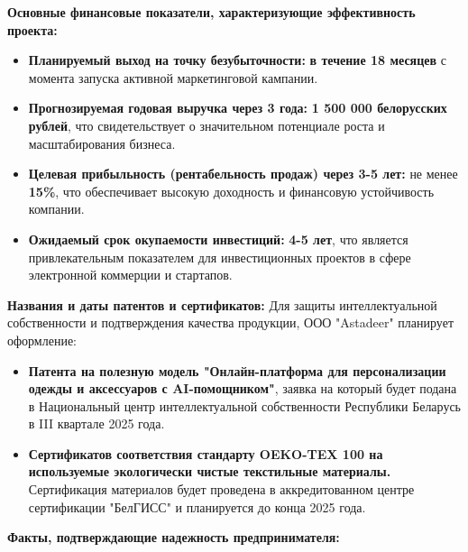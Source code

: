\vspace{0.5cm}

\textbf{Основные финансовые показатели, характеризующие эффективность проекта:}

\begin{itemize}
    \item \textbf{Планируемый выход на точку безубыточности:}  \textbf{в течение 18 месяцев} с момента запуска активной маркетинговой кампании.
    \item \textbf{Прогнозируемая годовая выручка через 3 года:}  \textbf{1 500 000 белорусских рублей}, что свидетельствует о значительном потенциале роста и масштабирования бизнеса.
    \item \textbf{Целевая прибыльность (рентабельность продаж) через 3-5 лет:}  не менее \textbf{15\%}, что обеспечивает высокую доходность и финансовую устойчивость компании.
    \item \textbf{Ожидаемый срок окупаемости инвестиций:}  \textbf{4-5 лет}, что является привлекательным показателем для инвестиционных проектов в сфере электронной коммерции и стартапов.
\end{itemize}

\vspace{0.5cm}

\textbf{Названия и даты патентов и сертификатов:}  Для защиты интеллектуальной собственности и подтверждения качества продукции, ООО "Astadeer" планирует оформление:

\begin{itemize}
    \item \textbf{Патента на полезную модель "Онлайн-платформа для персонализации одежды и аксессуаров с AI-помощником"}, заявка на который будет подана в Национальный центр интеллектуальной собственности Республики Беларусь в III квартале 2025 года.
    \item \textbf{Сертификатов соответствия стандарту OEKO-TEX 100 на используемые экологически чистые текстильные материалы.}  Сертификация материалов будет проведена в аккредитованном центре сертификации "БелГИСС" и планируется до конца 2025 года.
\end{itemize}

\vspace{0.5cm}

\textbf{Факты, подтверждающие надежность предпринимателя:}

